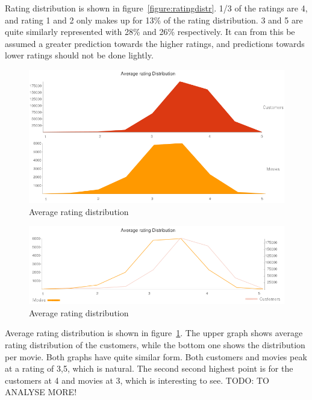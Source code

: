 Rating distribution is shown in figure~\ref{figure:ratingdistr}. 1/3 of the ratings are 4, and rating 1 and 2 only makes up for 13\% of the rating distribution. 3 and 5 are quite similarly represented with 28\% and 26\% respectively. It can from this be assumed a greater prediction towards the higher ratings, and predictions towards lower ratings should not be done lightly.

\begin{figure}[H]
\includegraphics[width=5in]{image/avgratingdistr.png}
\centering
\caption{Average rating distribution}
\label{figure:avgratingdistr}
\end{figure}

\begin{figure}[H]
\includegraphics[width=5in]{image/avgratdistrover.png}
\centering
\caption{Average rating distribution}
\label{figure:avgratdistrover}
\end{figure}


Average rating distribution is shown in figure~\ref{figure:avgratingdistr}. The upper graph shows average rating distribution of the customers, while the bottom one shows the distribution per movie. Both graphs have quite similar form. Both customers and movies peak at a rating of 3,5, which is natural. The second second highest point is for the customers at 4 and movies at 3, which is interesting to see. TODO: TO ANALYSE MORE!


